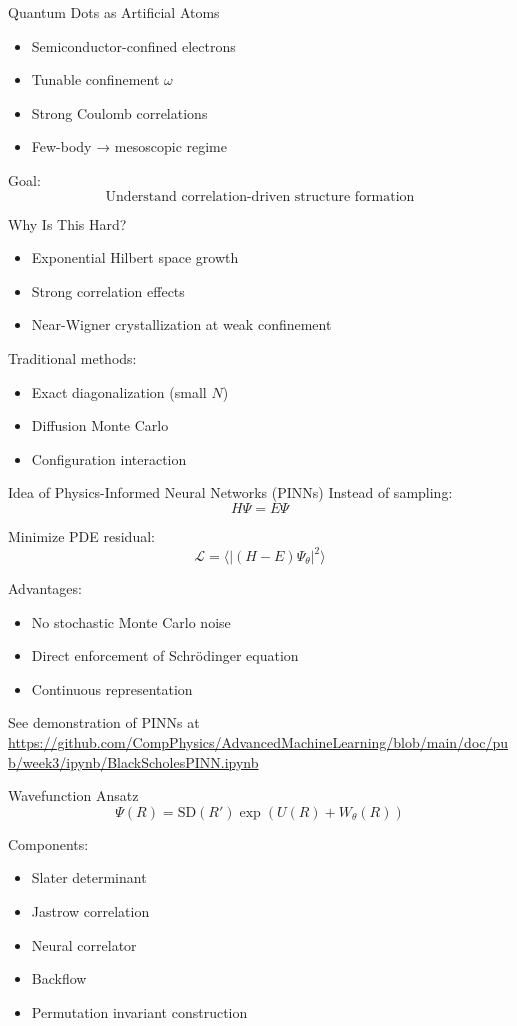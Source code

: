 \documentclass{beamer}
\begin{document}
\begin{frame}{Quantum Dots as Artificial Atoms}
\begin{itemize}
\item Semiconductor-confined electrons
\item Tunable confinement $\omega$
\item Strong Coulomb correlations
\item Few-body → mesoscopic regime
\end{itemize}

\vspace{0.3cm}
Goal:
\[
\text{Understand correlation-driven structure formation}
\]
\end{frame}


\begin{frame}{Why Is This Hard?}
\begin{itemize}
\item Exponential Hilbert space growth
\item Strong correlation effects
\item Near-Wigner crystallization at weak confinement
\end{itemize}

Traditional methods:
\begin{itemize}
\item Exact diagonalization (small $N$)
\item Diffusion Monte Carlo
\item Configuration interaction
\end{itemize}
\end{frame}

\begin{frame}{Idea of Physics-Informed Neural Networks (PINNs)}
Instead of sampling:
\[
H\Psi = E\Psi
\]

Minimize PDE residual:
\[
\mathcal{L}
=
\langle |(H-E)\Psi_\theta|^2 \rangle
\]

Advantages:
\begin{itemize}
\item No stochastic Monte Carlo noise
\item Direct enforcement of Schrödinger equation
\item Continuous representation
\end{itemize}
See demonstration of PINNs at \url{https://github.com/CompPhysics/AdvancedMachineLearning/blob/main/doc/pub/week3/ipynb/BlackScholesPINN.ipynb}
\end{frame}

\begin{frame}{Wavefunction Ansatz}
\[
\Psi(R)
=
\text{SD}(R')
\exp(U(R) + W_\theta(R))
\]

Components:
\begin{itemize}
\item Slater determinant
\item Jastrow correlation
\item Neural correlator
\item Backflow
\item Permutation invariant construction
\end{itemize}
\end{frame}
\end{document}
